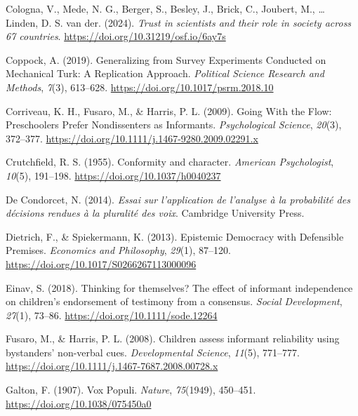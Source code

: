 \documentclass[
  doc,floatsintext]{apa6}
\newlength{\cslhangindent}
\newenvironment{CSLReferences}[2] %
 {\begin{list}{}{%
  \setlength{\itemindent}{0pt}
  \setlength{\leftmargin}{0pt}
  \setlength{\parsep}{0pt}
  \ifodd #1
   \setlength{\leftmargin}{\cslhangindent}
   \setlength{\itemindent}{-1\cslhangindent}
  \fi
  \setlength{\itemsep}{#2\baselineskip}}}
 {\end{list}}
\begin{document}
\begin{CSLReferences}{1}{0}
Cologna, V., Mede, N. G., Berger, S., Besley, J., Brick, C., Joubert, M., \ldots{} Linden, D. S. van der. (2024). \emph{Trust in scientists and their role in society across 67 countries}. \url{https://doi.org/10.31219/osf.io/6ay7s}

Coppock, A. (2019). Generalizing from Survey Experiments Conducted on Mechanical Turk: A Replication Approach. \emph{Political Science Research and Methods}, \emph{7}(3), 613--628. \url{https://doi.org/10.1017/psrm.2018.10}

Corriveau, K. H., Fusaro, M., \& Harris, P. L. (2009). Going With the Flow: Preschoolers Prefer Nondissenters as Informants. \emph{Psychological Science}, \emph{20}(3), 372--377. \url{https://doi.org/10.1111/j.1467-9280.2009.02291.x}

Crutchfield, R. S. (1955). Conformity and character. \emph{American Psychologist}, \emph{10}(5), 191--198. \url{https://doi.org/10.1037/h0040237}

De Condorcet, N. (2014). \emph{Essai sur l'application de l'analyse à la probabilité des décisions rendues à la pluralité des voix}. Cambridge University Press.

Dietrich, F., \& Spiekermann, K. (2013). Epistemic Democracy with Defensible Premises. \emph{Economics and Philosophy}, \emph{29}(1), 87--120. \url{https://doi.org/10.1017/S0266267113000096}

Einav, S. (2018). Thinking for themselves? The effect of informant independence on children's endorsement of testimony from a consensus. \emph{Social Development}, \emph{27}(1), 73--86. \url{https://doi.org/10.1111/sode.12264}

Fusaro, M., \& Harris, P. L. (2008). Children assess informant reliability using bystanders{'} non-verbal cues. \emph{Developmental Science}, \emph{11}(5), 771--777. \url{https://doi.org/10.1111/j.1467-7687.2008.00728.x}

Galton, F. (1907). Vox Populi. \emph{Nature}, \emph{75}(1949), 450--451. \url{https://doi.org/10.1038/075450a0}


\end{CSLReferences}
\end{document}
